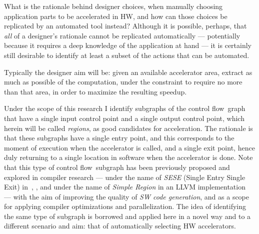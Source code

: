 \documentclass[]{usiinfthesis}
\newcommand{\controlflow}{control flow}
\begin{document}
What is the rationale behind designer choices, when manually choosing
application parts to be accelerated in HW, and how can those choices
be replicated by an automated tool instead? Although it is possible,
perhaps, that \emph{all} of a designer's rationale cannot be
replicated automatically --- potentially because it requires a deep
knowledge of the application at hand --- it is certainly still
desirable to identify at least a subset of the actions that can be
automated.\par

Typically the designer aim will be: given an available accelerator
area, extract as much as possible of the computation, under the
constraint to require no more than that area, in order to maximize the
resulting speedup.\par 

Under the scope of this research I identify subgraphs of the \controlflow\ 
graph that have a single input control point and a single output control point, 
which herein will be called \emph{regions}, as good candidates for 
acceleration. The rationale
is that these subgraphs have a single entry point, and this
corresponds to the moment of execution when the accelerator is called,
and a single exit point, hence duly returning to a single location in
software when the accelerator is done. Note that this type of
\controlflow\ subgraph has been previously proposed and explored in
compiler research --- under the name of \emph{SESE} (Single Entry
Single Exit) in~\cite{AguilarJune16}, \cite{JohnsonJun94}, and under
the name of \emph{Simple Region} in an LLVM
implementation~\cite{LattnerMar04} --- with the aim of improving the
quality of \emph{SW code generation}, and as a scope for applying
compiler optimizations and parallelization. The idea of
identifying the same type of subgraph is borrowed and applied here in a 
novel way and to a different scenario and aim: that of automatically 
selecting HW accelerators.\par
\end{document}

